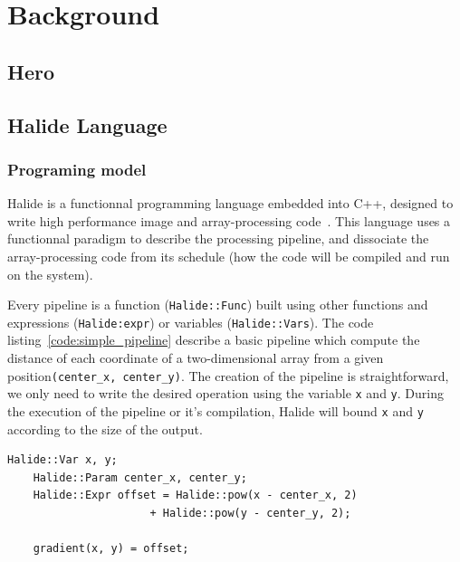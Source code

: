 
\chapter{Background}
\section{Hero}
\section{Halide Language}
	\subsection { Programing model}
		Halide is a functionnal programming language embedded into C++, designed to write high performance image and array-processing code~\cite{Web:Halide}. This language uses a functionnal paradigm to describe the processing pipeline, and dissociate the array-processing code from its schedule (how the code will be compiled and run on the system). 


		Every pipeline is a function (\texttt{Halide::Func}) built using other functions and expressions (\verb|Halide:expr|) or variables (\texttt{Halide::Vars}).
		The code listing~\ref{code:simple_pipeline} describe a basic pipeline which compute the distance of each coordinate of a two-dimensional array from a given position\texttt{(center\_x, center\_y)}. 
		The creation of the pipeline is straightforward, we only need to write the desired operation using the variable \verb|x| and \verb|y|. During the execution of the pipeline or it's compilation, Halide will bound \verb|x| and \verb|y| according to the size of the output.
\lstset{basicstyle=\ttfamily\footnotesize,breaklines=true,tabsize=2}
\begin{lstlisting}[caption={Simple Pipeline Example}, captionpos=b, label={code:simple_pipeline}]
	Halide::Var x, y;
	Halide::Param center_x, center_y;
	Halide::Expr offset = Halide::pow(x - center_x, 2) 
                      + Halide::pow(y - center_y, 2);

	gradient(x, y) = offset;
\end{lstlisting}

